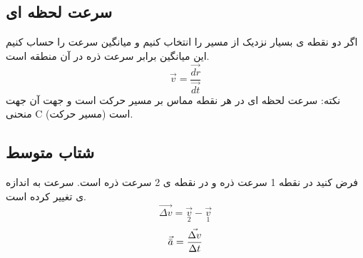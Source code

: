 \documentclass[12px, a4paper, oneside]{article}
\begin{document}
\subsection*{سرعت لحظه ای}
اگر دو نقطه ی بسیار نزدیک از مسیر را انتخاب کنیم و میانگین سرعت را حساب کنیم این میانگین برابر سرعت ذره در آن منطقه است.
\[ \vec{v} = \frac{\vec{dr}}{\vec{dt}}\]
نکته: سرعت لحظه ای در هر نقطه مماس بر مسیر حرکت است و جهت آن جهت منحنی C (مسیر حرکت) است.

\subsection*{شتاب متوسط}
فرض کنید در نقطه 1 سرعت ذره 
و در نقطه ی 2 سرعت ذره 
است. سرعت به اندازه ی
تغییر کرده است.
\[\vec{\Delta{v}} = \vec{\underset{2}{v}} - \vec{\underset{1}{v}}\]
\[\vec{\bar{a}} = \frac{\vec{\Delta{v}}}{\Delta{t}}\]
\end{document}
